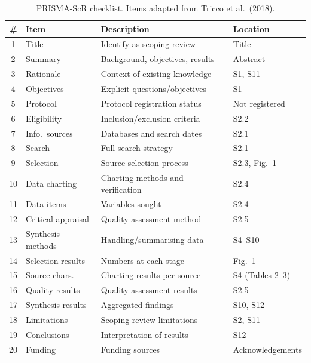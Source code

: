 \documentclass[preprint,12pt]{elsarticle}
\begin{document}
\begin{table}[htbp]
\centering
\caption{PRISMA-ScR checklist. Items adapted from Tricco et al.\ (2018).}
\label{tab:prisma_checklist}
\scriptsize
\setlength{\tabcolsep}{2pt}
\renewcommand{\arraystretch}{0.72}
\begin{tabular}{@{}clll@{}}
\toprule
\textbf{\#} & \textbf{Item} & \textbf{Description} & \textbf{Location} \\
\midrule
1  & Title              & Identify as scoping review        & Title \\
2  & Summary            & Background, objectives, results   & Abstract \\
3  & Rationale          & Context of existing knowledge     & S1, S11 \\
4  & Objectives         & Explicit questions/objectives      & S1 \\
5  & Protocol           & Protocol registration status       & Not registered \\
6  & Eligibility        & Inclusion/exclusion criteria       & S2.2 \\
7  & Info.\ sources     & Databases and search dates         & S2.1 \\
8  & Search             & Full search strategy               & S2.1 \\
9  & Selection          & Source selection process            & S2.3, Fig.~1 \\
10 & Data charting      & Charting methods and verification  & S2.4 \\
11 & Data items         & Variables sought                   & S2.4 \\
12 & Critical appraisal & Quality assessment method          & S2.5 \\
13 & Synthesis methods  & Handling/summarising data          & S4--S10 \\
14 & Selection results  & Numbers at each stage              & Fig.~1 \\
15 & Source chars.      & Charting results per source        & S4 (Tables 2--3) \\
16 & Quality results    & Quality assessment results         & S2.5 \\
17 & Synthesis results  & Aggregated findings                & S10, S12 \\
18 & Limitations        & Scoping review limitations         & S2, S11 \\
19 & Conclusions        & Interpretation of results          & S12 \\
20 & Funding            & Funding sources                    & Acknowledgements \\
\bottomrule
\end{tabular}
\end{table}



\end{document}
